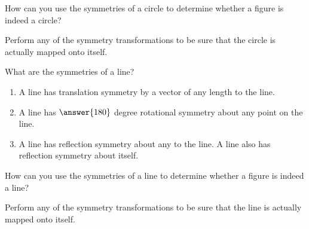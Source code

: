 \documentclass[nooutcomes]{ximera}
\begin{document}
\begin{question}
How can you use the symmetries of a circle to determine whether a figure is indeed a circle?  
\begin{freeResponse}
\end{freeResponse}
\begin{hint}
Perform any of the symmetry transformations to be sure that the circle is actually mapped onto itself.  
\end{hint}
\end{question}

\begin{question}
What are the symmetries of a line?  
\begin{freeResponse}
\end{freeResponse}
\begin{hint}
\begin{enumerate}
\item A line has translation symmetry by a vector of any length  to the line.   
\item A line has $\answer{180}$ degree rotational symmetry about any point on the line.  
\item A line has reflection symmetry about any  to the line.  A line also has reflection symmetry about itself.  
\end{enumerate}
\end{hint}
\end{question}


\begin{question}
How can you use the symmetries of a line to determine whether a figure is indeed a line? 
\begin{freeResponse}
\end{freeResponse}
\begin{hint}
Perform any of the symmetry transformations to be sure that the line is actually mapped onto itself.  
\end{hint}
\end{question}

\end{document}
